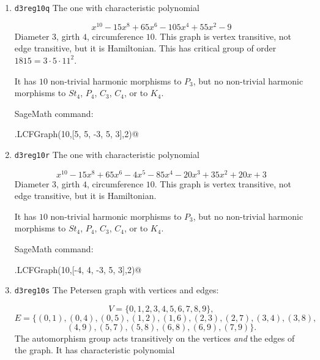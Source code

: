 \documentclass[12pt,letterpaper]{article}
\theoremstyle{definition}
\begin{document}
\begin{enumerate}
It has $2$ non-trivial harmonic morphisms to $P_3$,
but no non-trivial harmonic morphisms to $St_4$, $P_4$,
$C_3$, $C_4$, or to $K_4$.


SageMath command:

\verb@graphs.LCFGraph(10,[5, -4, 4, 5, 5],2)@


\item
  {\tt d3reg10q}\newline
The one with %
characteristic polynomial  

\[
x^{10} - 15x^8 + 65x^6 - 105x^4 + 55x^2 - 9  
\]
Diameter $3$,
girth $4$,
circumference $10$.
This graph is vertex transitive, not edge transitive, but it is
Hamiltonian.%
This has critical group of order $1815=3\cdot 5\cdot 11^2$.

It has $10$ non-trivial harmonic morphisms to $P_3$,
but no non-trivial harmonic morphisms to $St_4$, $P_4$, $C_3$,
$C_4$, or to $K_4$.

SageMath command:

\verb@graphs.LCFGraph(10,[5, 5, -3, 5, 3],2)@


\item
  {\tt d3reg10r}\newline
The one with %
characteristic polynomial  

\[
x^{10} - 15x^8 + 65x^6 - 4x^5 - 85x^4 - 20x^3 + 35x^2 + 20x + 3
\]
Diameter $3$,
girth $4$,
circumference $10$.
This graph is vertex transitive, not edge transitive,
but it is Hamiltonian.%

It has $10$ non-trivial harmonic morphisms to $P_3$,
but no non-trivial harmonic morphisms to $St_4$, $P_4$, $C_3$, $C_4$,
or to $K_4$.


SageMath command:

\verb@graphs.LCFGraph(10,[-4, 4, -3, 5, 3],2)@


\item
  {\tt d3reg10s}
  The Petersen graph with vertices and edges:

\[
V=\{ 0,1,2,3,4,5,6,7,8,9\},
\]
\[
E = \{ (0, 1), (0, 4), (0, 5), (1, 2), (1, 6), (2, 3), (2, 7), (3, 4), (3, 8),
\]
\[
(4, 9), (5, 7), (5, 8), (6, 8), (6, 9), (7, 9) \}.
\]
The automorphism group acts transitively
on the vertices {\it and} the edges of the graph. It has
characteristic polynomial  


\end{enumerate}
\end{document}
